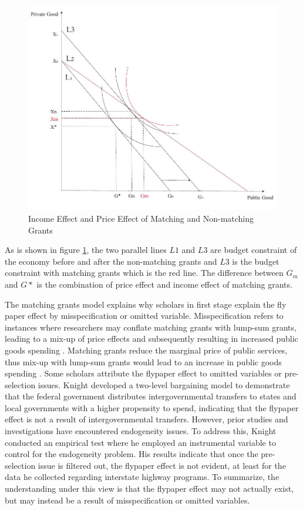 \begin{figure}[H]
    \centering
    \includegraphics[scale=0.4]{Chapter-4/Figures/mfyeffect.jpg}
    \caption[Income Effect and Price Effect of Matching and Non-matching Grants]{Income Effect and Price Effect of Matching and Non-matching Grants
        \texttt{} }
    \label{Figure 3.3}
\end{figure}

As is shown in figure \ref{Figure 3.3}, the two parallel lines $L1$ and $L3$ are budget constraint of the economy before and after the non-matching grants and $L3$ is the budget constraint with matching grants which is the red line. The difference between $G_m$ and $G*$ is the combination of price effect and income effect of matching grants.

The matching grants model explains why scholars in first stage explain the fly paper effect by misspecification or omitted variable. Misspecification refers to instances where researchers may conflate matching grants with lump-sum grants, leading to a mix-up of price effects and subsequently resulting in increased public goods spending \cite{lankford1987note,henderson1968local}. Matching grants reduce the marginal price of public services, thus mix-up with lump-sum grants would lead to an increase in public goods spending \cite{gramlich1997state}. Some scholars attribute the flypaper effect to omitted variables or pre-selection issues. Knight \cite{knight2002endogenous} developed a two-level bargaining model to demonstrate that the federal government distributes intergovernmental transfers to states and local governments with a higher propensity to spend, indicating that the flypaper effect is not a result of intergovernmental transfers. However, prior studies and investigations have encountered endogeneity issues. To address this, Knight conducted an empirical test where he employed an instrumental variable to control for the endogeneity problem. His results indicate that once the pre-selection issue is filtered out, the flypaper effect is not evident, at least for the data he collected regarding interstate highway programs. To summarize, the understanding under this view is that the flypaper effect may not actually exist, but may instead be a result of misspecification or omitted variables.

